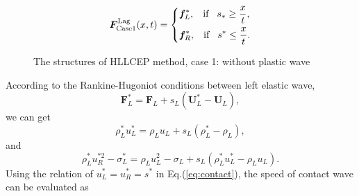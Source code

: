 \documentclass{article}
\theoremstyle{plain}\newtheorem{definition}{\sc{Definition}}
\theoremstyle{defination}\newtheorem{example}{Example}[section]
\numberwithin{equation}{section}
\numberwithin{table}{section}
\begin{document}
\begin{equation}
	\bm{F}^{\text{Lag}}_{\text{Case1}}(x,t) = \left\{ \begin{aligned}
		& \bm{f}_L^*, \hspace{0.3cm} \text{if} \hspace{0.3cm} s_*\ge \frac{x}{t},\\
		& \bm{f}_R^*, \hspace{0.3cm} \text{if} \hspace{0.3cm} s^*\le \frac{x}{t}.\\
	  \end{aligned}
	\right.
  \end{equation}

\begin{figure}
  \centering
\caption{The  structures of HLLCEP method, case 1: without plastic wave}
\end{figure}
According to the Rankine-Hugoniot conditions between left elastic wave,
\begin{equation} \label{eq:RH1}
	\bm{F}_L^* = \bm{F}_L+s_L (\bm{U}_L^*-\bm{U}_L),
\end{equation}
we can  get 
\begin{equation} \label{eq:rhoLstar}
  \rho_L^* u_L^*=\rho_L u_L+s_L(\rho_L^*-\rho_L),
\end{equation}
and
\begin{equation}\label{eq:sigma}
  \rho_L^* u_R^{*2}-\sigma^*_L=\rho_L u_L^2-\sigma_L+s_L(\rho_L^* u_L^*-\rho_L u_L).
\end{equation}
Using the relation of $u_L^* =u_R^* = s^*$ in Eq.(\ref{eq:contact}), the speed of contact wave can be evaluated as 
\end{document}
